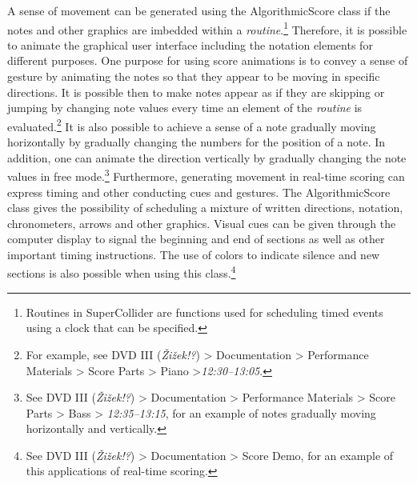 A sense of movement can be generated using the AlgorithmicScore class if the notes and other graphics are imbedded within a \emph{routine}.\footnote{Routines in SuperCollider are functions used for scheduling timed events using a clock that can be specified.} Therefore, it is possible to animate the graphical user interface including the notation elements for different purposes. One purpose for using score animations is to convey a sense of gesture by animating the notes so that they appear to be moving in specific directions. It is possible then to make notes appear as if they are skipping or jumping by changing note values every time an element of the \emph{routine} is evaluated.\footnote{For example, see DVD III (\emph{\v{Z}i\v{z}ek!?}) \tiny \textgreater \footnotesize \hspace{0pt} Documentation \tiny \textgreater \footnotesize \hspace{0pt} Performance Materials \tiny \textgreater \footnotesize \hspace{0pt} Score Parts \tiny \textgreater \footnotesize \hspace{0pt} Piano \tiny \textgreater \footnotesize \hspace{0pt}\mbox{\emph{12:30--13:05}}.} It is also possible to achieve a sense of a note gradually moving horizontally by gradually changing the numbers for the position of a note. In addition, one can animate the direction vertically by gradually changing the note values in free mode.\footnote{See DVD III (\emph{\v{Z}i\v{z}ek!?}) \tiny \textgreater \footnotesize \hspace{0pt} Documentation \tiny \textgreater \footnotesize \hspace{0pt} Performance Materials \tiny \textgreater \footnotesize \hspace{0pt} Score Parts \tiny \textgreater \footnotesize \hspace{0pt} Bass \tiny \textgreater \footnotesize \hspace{0pt} \mbox{\emph{12:35--13:15}}, for an example of notes gradually moving horizontally and vertically.} Furthermore, generating movement in real-time scoring can express timing and other conducting cues and gestures. The AlgorithmicScore class gives the possibility of scheduling a mixture of written directions, notation, chronometers, arrows and other graphics.  Visual cues can be given through the computer display to signal the beginning and end of sections as well as other important timing instructions. The use of colors to indicate silence and new sections is also possible when using this class.\footnote{See DVD III (\emph{\v{Z}i\v{z}ek!?}) \tiny \textgreater \footnotesize \hspace{0pt} Documentation \tiny \textgreater \footnotesize \hspace{0pt} Score Demo, for an example of this applications of real-time scoring.} 

